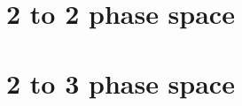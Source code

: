 \documentclass[
  english,		%
  a4paper,		%
  11pt,			%
  DIV=12,
  titlepage,
  toc=bibnumbered,
  parskip=full,  	%
  headings=normal,
  BCOR=12mm,
  numbers=noenddot
]{scrartcl}
\begin{document}
\section{2 to 2 phase space}


\section{2 to 3 phase space}


\newpage
\appendix


\listoffixmes
\end{document}
